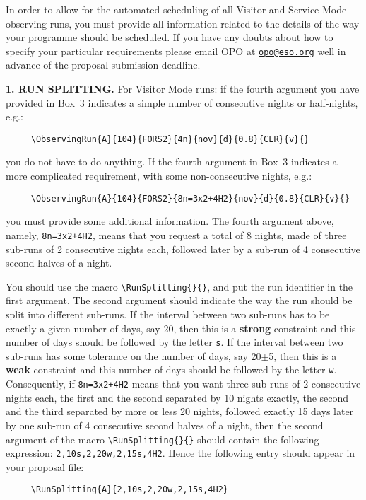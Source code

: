 \documentclass{article}
\begin{document}
In order to allow for the automated scheduling of all
Visitor and Service Mode observing runs, you must provide all
information related to the details of the way your programme should be
scheduled.  If you have any doubts about how to specify your particular
requirements please email OPO at \href{mailto:opo@eso.org}{\tt opo@eso.org}
well in advance of the proposal submission deadline.

\medskip

{\bf 1. RUN SPLITTING.} For Visitor Mode runs: if the fourth argument
you have provided in 
Box~3 indicates a simple number of consecutive nights or half-nights,
e.g.:
\begin{verbatim}
     \ObservingRun{A}{104}{FORS2}{4n}{nov}{d}{0.8}{CLR}{v}{}
\end{verbatim}
you do not have to do anything.  If the fourth argument in Box~3
indicates a more complicated requirement, with some non-consecutive
nights, e.g.: 
\begin{verbatim}
     \ObservingRun{A}{104}{FORS2}{8n=3x2+4H2}{nov}{d}{0.8}{CLR}{v}{}
\end{verbatim}
you must provide some additional information.  The fourth argument above,
namely, \verb|8n=3x2+4H2|, means that you request a total of 8 nights,
made of three sub-runs of 2 consecutive nights each, followed later by
a sub-run of 4 consecutive second halves of a night.

You should use the macro \verb|\RunSplitting{}{}|, and put
the run identifier in the first argument.  The second argument should indicate
the way the run should be split into different sub-runs.  If the
interval between two sub-runs has to be exactly a given number of
days, say 20, then this is a {\bf strong} constraint and this number
of days should be followed by the letter \verb|s|.  If the interval
between two sub-runs has some tolerance on the number of days, say
20$\pm$5, then this is a {\bf weak} constraint and this number of days
should be followed by the letter \verb|w|.  Consequently, if
\verb|8n=3x2+4H2| means that you want three sub-runs of 2 consecutive
nights each, the first and the second separated by 10 nights exactly,
the second and the third separated by more or less 20 nights, followed
exactly 15 days later by one sub-run of 4 consecutive second halves of
a night, then the second argument of the macro
\verb|\RunSplitting{}{}| should contain the following expression:
\verb|2,10s,2,20w,2,15s,4H2|. Hence the following entry should appear
in your proposal file:
\begin{verbatim}
     \RunSplitting{A}{2,10s,2,20w,2,15s,4H2}
\end{verbatim}
\end{document}
